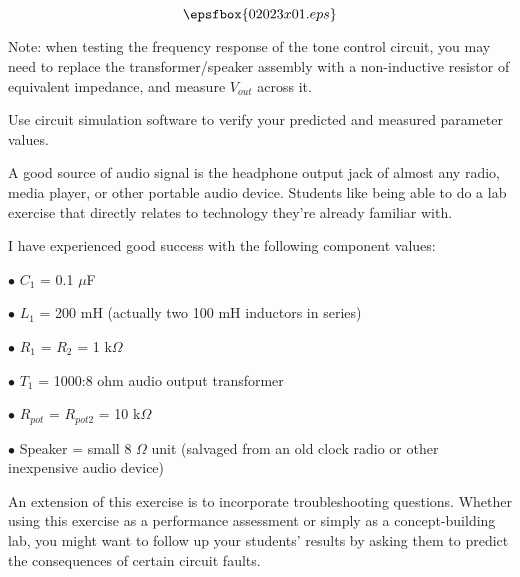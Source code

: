 

$$\epsfbox{02023x01.eps}$$

Note: when testing the frequency response of the tone control circuit, you may need to replace the transformer/speaker assembly with a non-inductive resistor of equivalent impedance, and measure $V_{out}$ across it. 

\vfil \eject






Use circuit simulation software to verify your predicted and measured parameter values.







A good source of audio signal is the headphone output jack of almost any radio, media player, or other portable audio device.  Students like being able to do a lab exercise that directly relates to technology they're already familiar with.

I have experienced good success with the following component values:

\medskip
\item{$\bullet$} $C_1$ = 0.1 $\mu$F 
\item{$\bullet$} $L_1$ = 200 mH (actually two 100 mH inductors in series)
\item{$\bullet$} $R_1$ = $R_2$ = 1 k$\Omega$
\item{$\bullet$} $T_1$ = 1000:8 ohm audio output transformer
\item{$\bullet$} $R_{pot}$ = $R_{pot2}$ = 10 k$\Omega$
\item{$\bullet$} Speaker = small 8 $\Omega$ unit (salvaged from an old clock radio or other inexpensive audio device)
\medskip

An extension of this exercise is to incorporate troubleshooting questions.  Whether using this exercise as a performance assessment or simply as a concept-building lab, you might want to follow up your students' results by asking them to predict the consequences of certain circuit faults.




